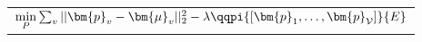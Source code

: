 \tiny
\begin{tabular}{@{}c@{}}
$\underset{P}{\mathrm{min}} \sum_v || \bm{p}_v - \bm{\mu}_v ||_2^2 -\lambda \qqpi{[\bm{p}_1, \ldots, \bm{p}_\mathcal{V}]}{E}$
\end{tabular}